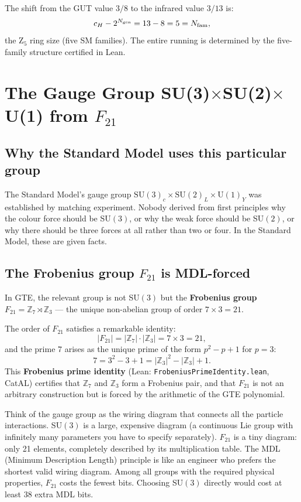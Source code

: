 \documentclass[11pt,a4paper]{article}
\newcommand{\term}[1]{\textbf{#1}}
\newcommand{\ZS}{\mathbb{Z}_7}
\newcommand{\Ngen}{N_{\rm gen}}
\newcommand{\Nfam}{N_{\rm fam}}
\newcommand{\cH}{c_H}
\newcommand{\lean}[1]{\texttt{#1}}
\begin{document}
The shift from the GUT value $3/8$ to the infrared value $3/13$ is:
\[
  \cH - 2^{\Ngen} = 13 - 8 = 5 = \Nfam,
\]
the Z$_5$ ring size (five SM families).  The entire running is determined by the
five-family structure certified in Lean.

\section{The Gauge Group \texorpdfstring{SU(3)$\times$SU(2)$\times$U(1)}{SU(3)xSU(2)xU(1)} from \texorpdfstring{$F_{21}$}{F21}}

\subsection{Why the Standard Model uses this particular group}

The Standard Model's gauge group $\mathrm{SU}(3)_c \times \mathrm{SU}(2)_L \times \mathrm{U}(1)_Y$
was established by matching experiment.  Nobody derived from first principles
why the colour force should be SU$(3)$, or why the weak force should be SU$(2)$,
or why there should be three forces at all rather than two or four.  In the
Standard Model, these are given facts.

\subsection{The Frobenius group \texorpdfstring{$F_{21}$}{F21} is MDL-forced}

In GTE, the relevant group is not SU$(3)$ but the
\term{Frobenius group} $F_{21} = \mathbb{Z}_7 \rtimes \mathbb{Z}_3$ --- the
unique non-abelian group of order $7 \times 3 = 21$.

The order of $F_{21}$ satisfies a remarkable identity:
\[
  |F_{21}| = |\ZS| \cdot |\mathbb{Z}_3| = 7 \times 3 = 21,
\]
and the prime $7$ arises as the unique prime of the form $p^2 - p + 1$ for $p = 3$:
\[
  7 = 3^2 - 3 + 1 = |\mathbb{Z}_3|^2 - |\mathbb{Z}_3| + 1.
\]
This \term{Frobenius prime identity} (Lean: \lean{FrobeniusPrimeIdentity.lean}, CatAL)
certifies that $\mathbb{Z}_7$ and $\mathbb{Z}_3$ form a Frobenius pair, and that $F_{21}$
is not an arbitrary construction but is forced by the arithmetic of the GTE polynomial.

\begin{tcolorbox}[colback=boxorange,colframe=orange!60!black,
  title=An analogy: minimum-cost wiring]
Think of the gauge group as the wiring diagram that connects all the particle
interactions.  SU$(3)$ is a large, expensive diagram (a continuous Lie group
with infinitely many parameters you have to specify separately).  $F_{21}$ is a
tiny diagram: only 21 elements, completely described by its multiplication table.
The MDL (Minimum Description Length) principle is like an engineer who prefers
the shortest valid wiring diagram.  Among all groups with the required physical
properties, $F_{21}$ costs the fewest bits.  Choosing SU$(3)$ directly would
cost at least 38 extra MDL bits.
\end{tcolorbox}
\end{document}
